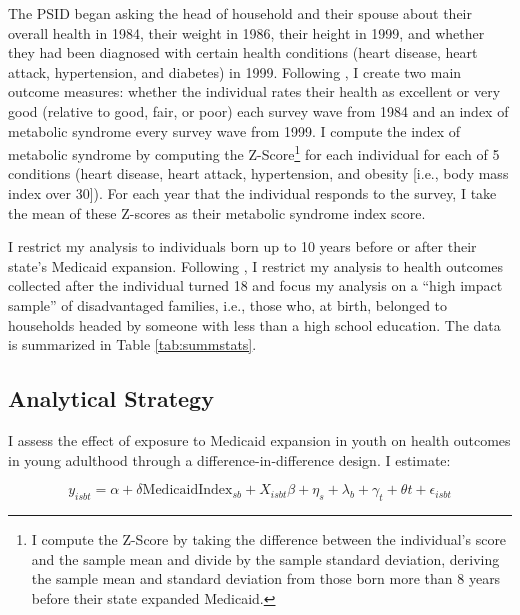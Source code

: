 \documentclass[12pt]{article}
\begin{document}
The PSID began asking the head of household and their spouse about their overall health in 1984, their weight in 1986, their height in 1999, and whether they had been diagnosed with certain health conditions (heart disease, heart attack, hypertension, and diabetes) in 1999. Following \citet{hoynesLongRunImpactsChildhood2016}, I create two main outcome measures: whether the individual rates their health as excellent or very good (relative to good, fair, or poor) each survey wave from 1984 and an index of metabolic syndrome every survey wave from 1999. I compute the index of metabolic syndrome by computing the Z-Score\footnote{I compute the Z-Score by taking the difference between the individual's score and the sample mean and divide by the sample standard deviation, deriving the sample mean and standard deviation from those born more than 8 years before their state expanded Medicaid.} for each individual for each of 5 conditions (heart disease, heart attack, hypertension, and obesity [i.e., body mass index over 30]). For each year that the individual responds to the survey, I take the mean of these Z-scores as their metabolic syndrome index score.

I restrict my analysis to individuals born up to 10 years before or after their state's Medicaid expansion. Following \citet{hoynesLongRunImpactsChildhood2016}, I restrict my analysis to health outcomes collected after the individual turned 18 and focus my analysis on a ``high impact sample'' of disadvantaged families, i.e., those who, at birth, belonged to households headed by someone with less than a high school education. The data is summarized in Table \ref{tab:summstats}.





\subsection{Analytical Strategy} \label{sec:analysis}

I assess the effect of exposure to Medicaid expansion in youth on health outcomes in young adulthood through a difference-in-difference design. I estimate:

\begin{equation}
  \label{eq:dd}
  y_{isbt} = \alpha + \delta\textrm{MedicaidIndex}_{sb}+X_{isbt}\beta+\eta_s+\lambda_b+\gamma_t+\theta t + \epsilon_{isbt}
\end{equation}
\end{document}
